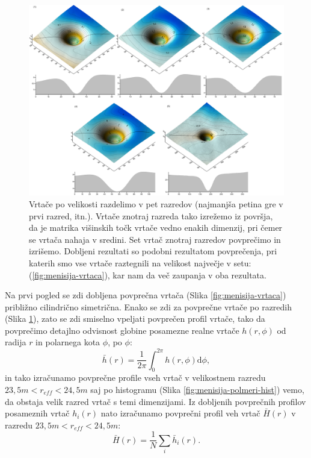 \documentclass[a4paper, twoside, 12pt]{book}
\begin{document}
  \begin{figure}[h!]
    \begin{center}
      \includegraphics[width=15cm,angle=90]{slike/vrtace-po-razredih-menisija}
    \end{center}
    \caption{Vrtače po velikosti razdelimo v pet razredov (najmanjša petina gre v prvi razred, itn.). Vrtače znotraj razreda tako izrežemo iz površja, da je matrika višinskih točk vrtače vedno enakih dimenzij, pri čemer se vrtača nahaja v sredini. Set vrtač znotraj razredov povprečimo in izrišemo. Dobljeni rezultati so podobni rezultatom povprečenja, pri katerih smo vse vrtače raztegnili na velikost največje v setu: (\ref{fig:menisija-vrtaca}), kar nam da več zaupanja v oba rezultata.}
    \label{fig:menisija-vrtace-po-razredih}
  \end{figure}

Na prvi pogled se zdi dobljena povprečna vrtača (Slika \ref{fig:menisija-vrtaca}) približno cilindrično simetrična. Enako se zdi za povprečne vrtače po razredih (Slika \ref{fig:menisija-vrtace-po-razredih}), zato se zdi smiselno vpeljati povprečen profil vrtače, tako da povprečimo detajlno odvisnost globine posamezne realne vrtače $h(r,\phi)$ od radija $r$ in polarnega kota $\phi$, po $\phi$:
\begin{equation} 
  \bar h(r) = \frac{1}{2 \pi} \int_0^{2\pi} h(r,\phi) \mathrm{d}\phi,
  \label{povprecenje-phi}
\end{equation}
in tako izračunamo povprečne profile vseh vrtač v velikostnem razredu $23,5m < r_{eff} < 24,5m$ saj po histogramu (Slika \ref{fig:menisija-polmeri-hist}) vemo, da obstaja velik razred vrtač s temi dimenzijami. Iz dobljenih povprečnih profilov posameznih vrtač $h_i(r)$ nato izračunamo povprečni profil veh vrtač $\bar H (r)$ v razredu $23,5m < r_{eff} < 24,5m$:
\begin{equation} 
  \bar H(r) = \frac{1}{N} \sum_{i} \bar h_i(r).
  \label{povprecenje-profilov}
\end{equation}
\end{document}
